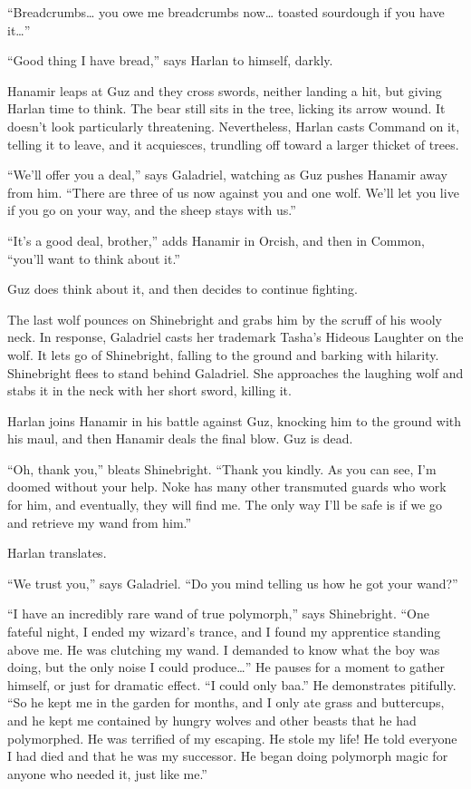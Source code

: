 \documentclass[smalldemyvopaper,11pt,twoside,onecolumn,openright,extrafontsizes]{memoir}
\begin{document}
``Breadcrumbs\ldots{} you owe me breadcrumbs now\ldots{} toasted
sourdough if you have it\ldots{}''

``Good thing I have bread,'' says Harlan to himself, darkly.

Hanamir leaps at Guz and they cross swords, neither landing a hit, but
giving Harlan time to think. The bear still sits in the tree, licking
its arrow wound. It doesn't look particularly threatening. Nevertheless,
Harlan casts Command on it, telling it to leave, and it acquiesces,
trundling off toward a larger thicket of trees.

``We'll offer you a deal,'' says Galadriel, watching as Guz pushes
Hanamir away from him. ``There are three of us now against you and one
wolf. We'll let you live if you go on your way, and the sheep stays with
us.''

``It's a good deal, brother,'' adds Hanamir in Orcish, and then in
Common, ``you'll want to think about it.''

Guz does think about it, and then decides to continue fighting.

The last wolf pounces on Shinebright and grabs him by the scruff of his
wooly neck. In response, Galadriel casts her trademark Tasha's Hideous
Laughter on the wolf. It lets go of Shinebright, falling to the ground
and barking with hilarity. Shinebright flees to stand behind Galadriel.
She approaches the laughing wolf and stabs it in the neck with her short
sword, killing it.

Harlan joins Hanamir in his battle against Guz, knocking him to the
ground with his maul, and then Hanamir deals the final blow. Guz is
dead.

``Oh, thank you,'' bleats Shinebright. ``Thank you kindly. As you can
see, I'm doomed without your help. Noke has many other transmuted guards
who work for him, and eventually, they will find me. The only way I'll
be safe is if we go and retrieve my wand from him.''

Harlan translates.

``We trust you,'' says Galadriel. ``Do you mind telling us how he got
your wand?''

``I have an incredibly rare wand of true polymorph,'' says Shinebright.
``One fateful night, I ended my wizard's trance, and I found my
apprentice standing above me. He was clutching my wand. I demanded to
know what the boy was doing, but the only noise I could
produce\ldots{}'' He pauses for a moment to gather himself, or just for
dramatic effect. ``I could only baa.'' He demonstrates pitifully. ``So
he kept me in the garden for months, and I only ate grass and
buttercups, and he kept me contained by hungry wolves and other beasts
that he had polymorphed. He was terrified of my escaping. He stole my
life! He told everyone I had died and that he was my successor. He began
doing polymorph magic for anyone who needed it, just like me.''
\end{document}
